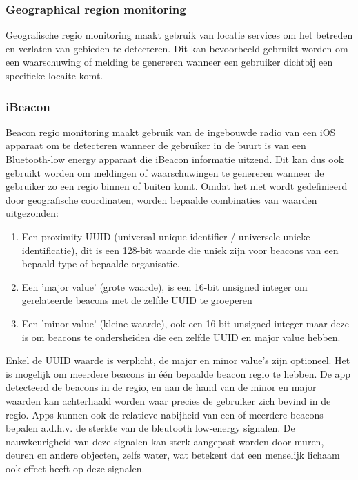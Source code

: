 \subsubsection{Geographical region monitoring}
Geografische regio monitoring maakt gebruik van locatie services om het betreden en verlaten van gebieden te detecteren. Dit kan bevoorbeeld gebruikt worden om een waarschuwing of melding te genereren wanneer een gebruiker dichtbij een specifieke locaite komt. 

\subsubsection{iBeacon}
Beacon regio monitoring maakt gebruik van de ingebouwde radio van een iOS apparaat om te detecteren wanneer de gebruiker in de buurt is van een Bluetooth-low energy apparaat die iBeacon informatie uitzend. Dit kan dus ook gebruikt worden om meldingen of waarschuwingen te genereren wanneer de gebruiker zo een regio binnen of buiten komt. Omdat het niet wordt gedefinieerd door geografische coordinaten, worden bepaalde combinaties van waarden uitgezonden:

\begin{enumerate}
  \item Een proximity UUID (universal unique identifier / universele unieke identificatie), dit is een 128-bit waarde die uniek zijn voor beacons van een bepaald type of bepaalde organisatie.
  \item Een 'major value' (grote waarde), is een 16-bit unsigned integer om gerelateerde beacons met de zelfde UUID te groeperen
  \item Een 'minor value' (kleine waarde), ook een 16-bit unsigned integer maar deze is om beacons te ondersheiden die een zelfde UUID en major value hebben.
\end{enumerate}

Enkel de UUID waarde is verplicht, de major en minor value's zijn optioneel. Het is mogelijk om meerdere beacons in één bepaalde beacon regio te hebben. De app detecteerd de beacons in de regio, en aan de hand van de minor en major waarden kan achterhaald worden waar precies de gebruiker zich bevind in de regio.
Apps kunnen ook de relatieve nabijheid van een of meerdere beacons bepalen a.d.h.v. de sterkte van de bleutooth low-energy signalen. De nauwkeurigheid van deze signalen kan sterk aangepast worden door muren, deuren en andere objecten, zelfs water, wat betekent dat een menselijk lichaam ook effect heeft op deze signalen.

